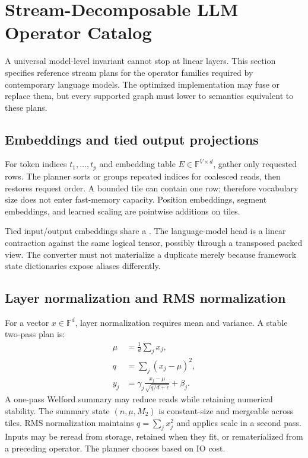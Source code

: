 \section{Stream-Decomposable LLM Operator Catalog}
\label{sec:operators}

A universal model-level invariant cannot stop at linear layers. This section specifies reference stream plans for the operator families required by contemporary language models. The optimized implementation may fuse or replace them, but every supported graph must lower to semantics equivalent to these plans.

\subsection{Embeddings and tied output projections}

For token indices $t_1,\ldots,t_p$ and embedding table $E\in\mathbb F^{V\times d}$, gather only requested rows. The planner sorts or groups repeated indices for coalesced reads, then restores request order. A bounded tile can contain one row; therefore vocabulary size does not enter fast-memory capacity. Position embeddings, segment embeddings, and learned scaling are pointwise additions on tiles.

Tied input/output embeddings share a . The language-model head is a linear contraction against the same logical tensor, possibly through a transposed packed view. The converter must not materialize a duplicate merely because framework state dictionaries expose aliases differently.

\subsection{Layer normalization and RMS normalization}

For a vector $x\in\mathbb F^d$, layer normalization requires mean and variance. A stable two-pass plan is:
\begin{align}
  \mu &= \frac1d\sum_j x_j,\\
  q &= \sum_j (x_j-\mu)^2,\\
  y_j &= \gamma_j\frac{x_j-\mu}{\sqrt{q/d+\epsilon}}+\beta_j.
\end{align}
A one-pass Welford summary may reduce reads while retaining numerical stability. The summary state $(n,\mu,M_2)$ is constant-size and mergeable across tiles. RMS normalization maintains $q=\sum_j x_j^2$ and applies scale in a second pass. Inputs may be reread from storage, retained when they fit, or rematerialized from a preceding operator. The planner chooses based on IO cost.


